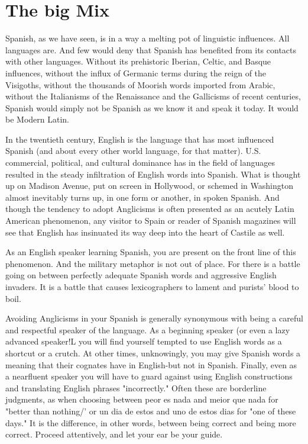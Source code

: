 \chapter{The big Mix}

Spanish, as we have seen, is in a way a melting pot of linguistic influences. All languages are. And few would deny that Spanish has
benefited from its contacts with other languages. Without its prehistoric Iberian, Celtic, and Basque influences, without the influx of Germanic terms during the reign of the Visigoths, without the thousands
of Moorish words imported from Arabic, without the Italianisms of
the Renaissance and the Gallicisms of recent centuries, Spanish would
simply not be Spanish as we know it and speak it today. It would be
Modern Latin.

In the twentieth century, English is the language that has most
influenced Spanish (and about every other world language, for that matter). U.S. commercial, political, and cultural dominance has in the field
of languages resulted in the steady infiltration of English words into
Spanish. What is thought up on Madison Avenue, put on screen in
Hollywood, or schemed in Washington almost inevitably turns up, in
one form or another, in spoken Spanish. And though the tendency to
adopt Anglicisms is often presented as an acutely Latin American phenomenon, any visitor to Spain or reader of Spanish magazines will see
that English has insinuated its way deep into the heart of Castile
as well.

As an English speaker learning Spanish, you are present on the
front line of this phenomenon. And the military metaphor is not out of
place. For there is a battle going on between perfectly adequate Spanish
words and aggressive English invaders. It is a battle that causes lexicographers to lament and purists' blood to boil.

Avoiding Anglicisms in your Spanish is generally synonymous
with being a careful and respectful speaker of the language. As a beginning speaker (or even a lazy advanced speaker!L you will find yourself
tempted to use English words as a shortcut or a crutch. At other times,
unknowingly, you may give Spanish words a meaning that their cognates have in English-but not in Spanish. Finally, even as a nearfluent speaker you will have to guard against using English constructions and translating English phrases "incorrectly." Often these are
borderline judgments, as when choosing between peor es nada and
meior que nada for "better than nothing/' or un dia de estos and
uno de estos dias for "one of these days." It is the difference, in other
words, between being correct and being more correct. Proceed attentively, and let your ear be your guide.

